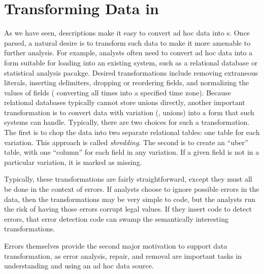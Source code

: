 \section{Transforming Data in \datatype{}}
\label{sec:data-transformation}

As we have seen, \datatype{} descriptions make it
easy to convert ad hoc data into \pvalue{}s.  Once parsed, a natural
desire is to transform such data to make it more amenable to further
analysis.  For example, analysts often need to convert ad hoc data
into a form suitable for loading into an existing system, such as a
relational database or statistical analysis pacakge.  Desired
transformations include removing extraneous literals, inserting
delimiters, dropping or reordering fields, and normalizing the values
of fields (\eg{} converting all times into a specified time zone).
Because relational databases typically cannot store unions directly,
another important transformation is to convert data with variation
(\ie{}, unions) into a form that such systems can handle.  Typically,
there are two choices for such a transformation.  The first is to chop
the data into two separate relational tables: one table for each
variation.  This approach is called \textit{shredding}. The second is
to create an ``uber'' table, with one ``column'' for each field in any
variation.  If a given field is not in a particular variation, it is
marked as missing.

Typically, these transformations are fairly straightforward, except
they must all be done in the context of errors.  If analysts choose to
ignore possible errors in the data, then the transformations may be
very simple to code, but the analysts run the risk of having those
errors corrupt legal values.  If they insert code to detect errors,
that error detection code can swamp the semantically interesting
transformations. 


Errors themselves provide the second major motivation to support data transformation, as error analysis, repair, and removal are important tasks in understanding and using an ad hoc data source.

